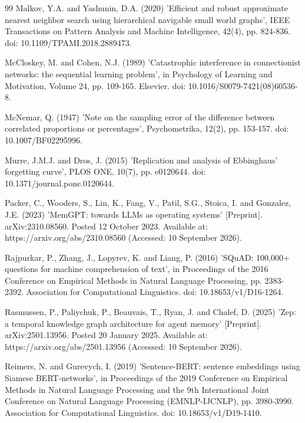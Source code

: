\documentclass[10pt,a4paper,twocolumn]{article}
\begin{document}
\begin{thebibliography}{99}
Malkov, Y.A. and Yashunin, D.A. (2020) 'Efficient and robust approximate nearest neighbor search using hierarchical navigable small world graphs', IEEE Transactions on Pattern Analysis and Machine Intelligence, 42(4), pp. 824-836. doi: 10.1109/TPAMI.2018.2889473.

McCloskey, M. and Cohen, N.J. (1989) 'Catastrophic interference in connectionist networks: the sequential learning problem', in Psychology of Learning and Motivation, Volume 24, pp. 109-165. Elsevier. doi: 10.1016/S0079-7421(08)60536-8.

McNemar, Q. (1947) 'Note on the sampling error of the difference between correlated proportions or percentages', Psychometrika, 12(2), pp. 153-157. doi: 10.1007/BF02295996.

Murre, J.M.J. and Dros, J. (2015) 'Replication and analysis of Ebbinghaus' forgetting curve', PLOS ONE, 10(7), pp. e0120644. doi: 10.1371/journal.pone.0120644.

Packer, C., Wooders, S., Lin, K., Fang, V., Patil, S.G., Stoica, I. and Gonzalez, J.E. (2023) 'MemGPT: towards LLMs as operating systems' [Preprint]. arXiv:2310.08560. Posted 12 October 2023. Available at: https://arxiv.org/abs/2310.08560 (Accessed: 10 September 2026).

Rajpurkar, P., Zhang, J., Lopyrev, K. and Liang, P. (2016) 'SQuAD: 100,000+ questions for machine comprehension of text', in Proceedings of the 2016 Conference on Empirical Methods in Natural Language Processing, pp. 2383-2392. Association for Computational Linguistics. doi: 10.18653/v1/D16-1264.

Rasmussen, P., Paliychuk, P., Beauvais, T., Ryan, J. and Chalef, D. (2025) 'Zep: a temporal knowledge graph architecture for agent memory' [Preprint]. arXiv:2501.13956. Posted 20 January 2025. Available at: https://arxiv.org/abs/2501.13956 (Accessed: 10 September 2026).

Reimers, N. and Gurevych, I. (2019) 'Sentence-BERT: sentence embeddings using Siamese BERT-networks', in Proceedings of the 2019 Conference on Empirical Methods in Natural Language Processing and the 9th International Joint Conference on Natural Language Processing (EMNLP-IJCNLP), pp. 3980-3990. Association for Computational Linguistics. doi: 10.18653/v1/D19-1410.


\end{thebibliography}
\end{document}
